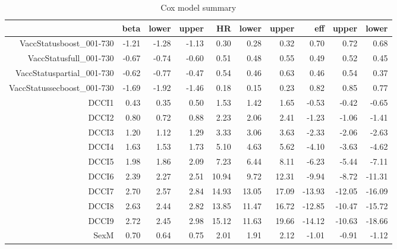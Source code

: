 \begin{table}[ht]
\centering
\begin{tabular}{rrrrrrrrrr}
  \hline
 & beta & lower & upper & HR & lower & upper & eff & upper & lower \\ 
  \hline
VaccStatusboost\_001-730 & -1.21 & -1.28 & -1.13 & 0.30 & 0.28 & 0.32 & 0.70 & 0.72 & 0.68 \\ 
  VaccStatusfull\_001-730 & -0.67 & -0.74 & -0.60 & 0.51 & 0.48 & 0.55 & 0.49 & 0.52 & 0.45 \\ 
  VaccStatuspartial\_001-730 & -0.62 & -0.77 & -0.47 & 0.54 & 0.46 & 0.63 & 0.46 & 0.54 & 0.37 \\ 
  VaccStatussecboost\_001-730 & -1.69 & -1.92 & -1.46 & 0.18 & 0.15 & 0.23 & 0.82 & 0.85 & 0.77 \\ 
  DCCI1 & 0.43 & 0.35 & 0.50 & 1.53 & 1.42 & 1.65 & -0.53 & -0.42 & -0.65 \\ 
  DCCI2 & 0.80 & 0.72 & 0.88 & 2.23 & 2.06 & 2.41 & -1.23 & -1.06 & -1.41 \\ 
  DCCI3 & 1.20 & 1.12 & 1.29 & 3.33 & 3.06 & 3.63 & -2.33 & -2.06 & -2.63 \\ 
  DCCI4 & 1.63 & 1.53 & 1.73 & 5.10 & 4.63 & 5.62 & -4.10 & -3.63 & -4.62 \\ 
  DCCI5 & 1.98 & 1.86 & 2.09 & 7.23 & 6.44 & 8.11 & -6.23 & -5.44 & -7.11 \\ 
  DCCI6 & 2.39 & 2.27 & 2.51 & 10.94 & 9.72 & 12.31 & -9.94 & -8.72 & -11.31 \\ 
  DCCI7 & 2.70 & 2.57 & 2.84 & 14.93 & 13.05 & 17.09 & -13.93 & -12.05 & -16.09 \\ 
  DCCI8 & 2.63 & 2.44 & 2.82 & 13.85 & 11.47 & 16.72 & -12.85 & -10.47 & -15.72 \\ 
  DCCI9 & 2.72 & 2.45 & 2.98 & 15.12 & 11.63 & 19.66 & -14.12 & -10.63 & -18.66 \\ 
  SexM & 0.70 & 0.64 & 0.75 & 2.01 & 1.91 & 2.12 & -1.01 & -0.91 & -1.12 \\ 
   \hline
\end{tabular}
\caption{Cox model summary} 
\end{table}
